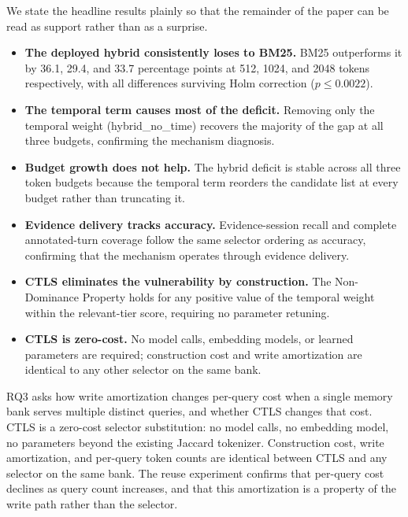 \label{sec:findings}

We state the headline results plainly so that the remainder of the paper can be read as support rather than as a surprise.

\begin{itemize}
  \item \textbf{The deployed hybrid consistently loses to BM25.} BM25 outperforms it by 36.1, 29.4, and 33.7 percentage points at 512, 1024, and 2048 tokens respectively, with all differences surviving Holm correction ($p \le 0.0022$).
  \item \textbf{The temporal term causes most of the deficit.} Removing only the temporal weight (hybrid\_no\_time) recovers the majority of the gap at all three budgets, confirming the mechanism diagnosis.
  \item \textbf{Budget growth does not help.} The hybrid deficit is stable across all three token budgets because the temporal term reorders the candidate list at every budget rather than truncating it.
  \item \textbf{Evidence delivery tracks accuracy.} Evidence-session recall and complete annotated-turn coverage follow the same selector ordering as accuracy, confirming that the mechanism operates through evidence delivery.
  \item \textbf{CTLS eliminates the vulnerability by construction.} The Non-Dominance Property holds for any positive value of the temporal weight within the relevant-tier score, requiring no parameter retuning.
  \item \textbf{CTLS is zero-cost.} No model calls, embedding models, or learned parameters are required; construction cost and write amortization are identical to any other selector on the same bank.
\end{itemize}

\label{sec:rq_lifecycle}

RQ3 asks how write amortization changes per-query cost when a single memory bank serves multiple distinct queries, and whether CTLS changes that cost. CTLS is a zero-cost selector substitution: no model calls, no embedding model, no parameters beyond the existing Jaccard tokenizer. Construction cost, write amortization, and per-query token counts are identical between CTLS and any selector on the same bank. The reuse experiment confirms that per-query cost declines as query count increases, and that this amortization is a property of the write path rather than the selector.
